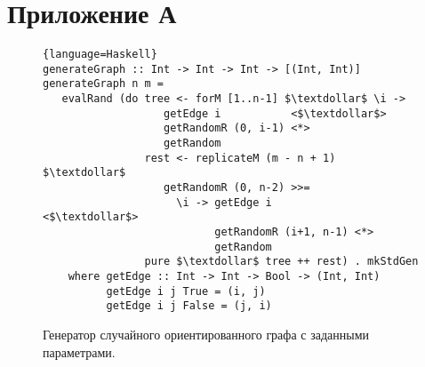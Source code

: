 \section*{Приложение А}

%
%


\begin{figure}[h!]
\begin{lstlisting}[basicstyle=\scriptsize]{language=Haskell}
generateGraph :: Int -> Int -> Int -> [(Int, Int)]
generateGraph n m =
   evalRand (do tree <- forM [1..n-1] $\textdollar$ \i ->
                   getEdge i           <$\textdollar$>
                   getRandomR (0, i-1) <*>
                   getRandom
                rest <- replicateM (m - n + 1) $\textdollar$
                   getRandomR (0, n-2) >>=
                     \i -> getEdge i             <$\textdollar$>
                           getRandomR (i+1, n-1) <*>
                           getRandom
                pure $\textdollar$ tree ++ rest) . mkStdGen
    where getEdge :: Int -> Int -> Bool -> (Int, Int)
          getEdge i j True = (i, j)
          getEdge i j False = (j, i)
\end{lstlisting}
\caption{Генератор случайного ориентированного графа с заданными параметрами.}
\label{fig:graphGen}
\end{figure}

